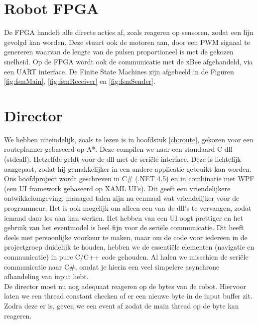 \documentclass{report}
\begin{document}
\section{Robot FPGA}
De FPGA handelt alle directe acties af, zoals reageren op sensoren, zodat een lijn gevolgd kan worden.
Deze stuurt ook de motoren aan, door een PWM signaal te genereren waarvan de lengte van de pulsen proportioneel is met de gekozen snelheid.
Op de FPGA wordt ook de communicatie met de xBee afgehandeld, via een UART interface.
De Finite State Machines zijn afgebeeld in de Figuren \ref{fig:fsmMain}, \ref{fig:fsmReceiver} en \ref{fig:fsmSender}.

\section{Director}
We hebben uiteindelijk, zoals te lezen is in hoofdstuk \ref{ch:route}, gekozen voor een routeplanner gebaseerd op A*. Deze compilen we naar een standaard C dll (stdcall).
Hetzelfde geldt voor de dll met de seriële interface. Deze is lichtelijk aangepast, zodat hij gemakkelijker in een andere applicatie gebruikt kan worden.
Ons hoofdproject wordt geschreven in C\# (.NET 4.5) en in combinatie met WPF (een UI framework gebaseerd op XAML UI's).
Dit geeft een vriendelijkere ontwikkelomgeving, managed talen zijn nu eenmaal wat vriendelijker voor de programmeur.
Het is ook mogelijk om alleen een van de dll's te vervangen, zodat iemand daar los aan kan werken.
Het hebben van een UI oogt prettiger en het gebruik van het eventmodel is heel fijn voor de seriële communicatie.
Dit heeft deels met persoonlijke voorkeur te maken, maar om de code voor iedereen in de projectgroep duidelijk te houden, hebben we de essentiële elementen (navigatie en communicatie) in pure C/C++ code gehouden. Al halen we misschien de seriële communicatie naar C\#, omdat je hierin een veel simpelere asynchrone afhandeling van input hebt.\\
De director moet nu nog adequaat reageren op de bytes van de robot.
Hiervoor laten we een thread constant checken of er een nieuwe byte in de input buffer zit. Zodra deze er is, geven we een event af zodat de main thread op de byte kan reageren.
\end{document}
